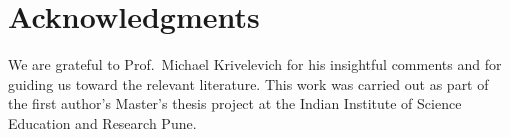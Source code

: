 \documentclass{article}
\theoremstyle{definition}
\theoremstyle{plain}
\theoremstyle{remark}
\theoremstyle{definition}
\begin{document}
\section*{Acknowledgments}
We are grateful to Prof.\ Michael Krivelevich for his insightful comments and for guiding us toward the relevant literature. This work was carried out as part of the first author's Master's thesis project at the Indian Institute of Science Education and Research Pune.
\printbibliography
\end{document}
